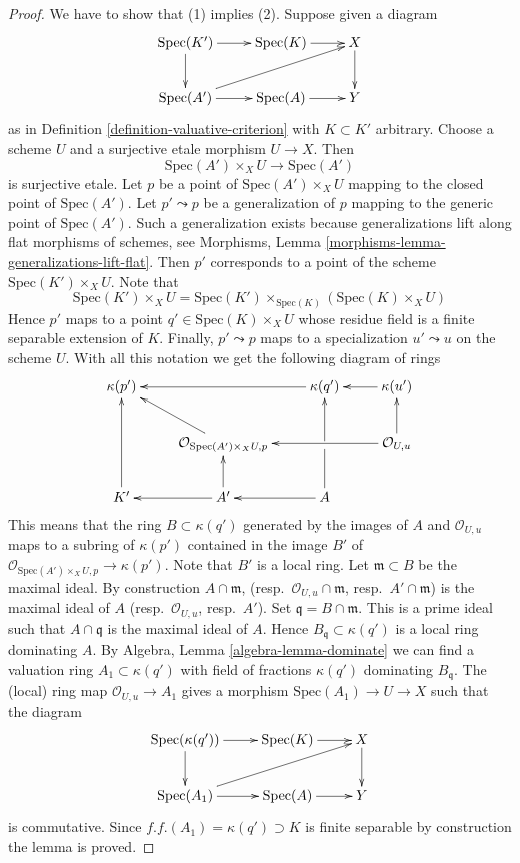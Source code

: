 \begin{proof}
We have to show that (1) implies (2). Suppose given a diagram
$$
\xymatrix{
\text{Spec}(K') \ar[r] \ar[d] & \text{Spec}(K) \ar[r] & X \ar[d] \\
\text{Spec}(A') \ar[r] \ar[rru] &\text{Spec}(A) \ar[r] & Y
}
$$
as in Definition \ref{definition-valuative-criterion} with $K \subset K'$
arbitrary. Choose a scheme $U$ and a surjective etale morphism $U \to X$.
Then
$$
\text{Spec}(A') \times_X U \longrightarrow \text{Spec}(A')
$$
is surjective etale. Let $p$ be a point of $\text{Spec}(A') \times_X U$
mapping to the closed point of $\text{Spec}(A')$. Let $p' \leadsto p$
be a generalization of $p$ mapping to the generic point of $\text{Spec}(A')$.
Such a generalization exists because generalizations lift along flat
morphisms of schemes, see
Morphisms, Lemma \ref{morphisms-lemma-generalizations-lift-flat}.
Then $p'$ corresponds to a point of the scheme $\text{Spec}(K') \times_X U$.
Note that
$$
\text{Spec}(K') \times_X U
=
\text{Spec}(K') \times_{\text{Spec}(K)} (\text{Spec}(K) \times_X U)
$$
Hence $p'$ maps to a point $q' \in \text{Spec}(K) \times_X U$ whose
residue field is a finite separable extension of $K$. Finally,
$p' \leadsto p$ maps to a specialization $u' \leadsto u$ on the
scheme $U$. With all this notation we get the following diagram of
rings
$$
\xymatrix{
\kappa(p') & & \kappa(q') \ar[ll] & \kappa(u') \ar[l] \\
& \mathcal{O}_{\text{Spec}(A') \times_X U, p} \ar[lu] & &
\mathcal{O}_{U, u} \ar[ll] \ar[u] \\
K' \ar[uu] & A' \ar[l] \ar[u] & A \ar[l] \ar'[u][uu]
}
$$
This means that the ring $B \subset \kappa(q')$ generated by
the images of $A$ and $\mathcal{O}_{U, u}$ maps to a subring
of $\kappa(p')$ contained in the image $B'$ of
$\mathcal{O}_{\text{Spec}(A') \times_X U, p} \to \kappa(p')$.
Note that $B'$ is a local ring. Let $\mathfrak m \subset B$
be the maximal ideal. By construction $A \cap \mathfrak m$,
(resp.\ $\mathcal{O}_{U, u} \cap \mathfrak m$, resp.\ $A' \cap \mathfrak m$)
is the maximal ideal of $A$ (resp.\ $\mathcal{O}_{U, u}$, resp.\ $A'$).
Set $\mathfrak q = B \cap \mathfrak m$. This is a
prime ideal such that $A \cap \mathfrak q$ is the maximal ideal of $A$.
Hence $B_{\mathfrak q} \subset \kappa(q')$ is a local ring dominating
$A$. By
Algebra, Lemma \ref{algebra-lemma-dominate}
we can find a valuation ring $A_1 \subset \kappa(q')$
with field of fractions $\kappa(q')$
dominating $B_{\mathfrak q}$. The (local) ring map
$\mathcal{O}_{U, u} \to A_1$ gives a morphism
$\text{Spec}(A_1) \to U \to X$
such that the diagram
$$
\xymatrix{
\text{Spec}(\kappa(q')) \ar[r] \ar[d] & \text{Spec}(K) \ar[r] & X \ar[d] \\
\text{Spec}(A_1) \ar[r] \ar[rru] &\text{Spec}(A) \ar[r] & Y
}
$$
is commutative. Since $f.f.(A_1) = \kappa(q') \supset K$ is finite
separable by construction the lemma is proved.
\end{proof}

